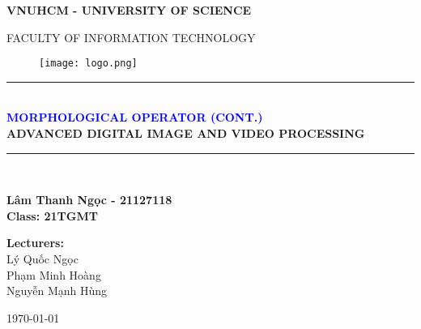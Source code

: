 \documentclass{report}
\newcommand\HRule{\rule{\textwidth}{1pt}}
\begin{document}
\begin{titlepage}


\begin{center}
\textsc{\Large \textbf{VNUHCM - UNIVERSITY OF SCIENCE}}\\

\bigskip

\textsc{\Large FACULTY OF INFORMATION TECHNOLOGY}\\

\bigskip

\begin{figure}[!h]
    \centering
    \texttt{[image: logo.png]}
\end{figure}

\HRule \\[0.4cm]
{\huge\bfseries \textcolor{blue}{MORPHOLOGICAL OPERATOR (CONT.)}}\\[0.4cm]
{\Large\bfseries ADVANCED DIGITAL IMAGE AND VIDEO PROCESSING}
\HRule \\[1cm]

\begin{center}
    \textbf{\Large Lâm Thanh Ngọc - 21127118} \\
    \medskip
    \Large{\textbf{Class: 21TGMT}}\\[4cm]
\end{center}

\begin{center}
    \textbf{\Large Lecturers: \\[0.2cm]}
    \Large{Lý Quốc Ngọc \\[0.2cm] Phạm Minh Hoàng \\ [0.2cm] Nguyễn Mạnh Hùng}
\end{center}
\vfill


{\today}
\end{center}
\end{titlepage}
\end{document}
